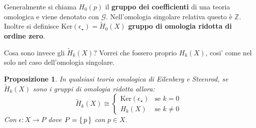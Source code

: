 \documentclass[10pt, twoside=false, x11names]{scrbook}
\newtheorem{proposition}[theorem]{Proposizione}
\newcommand{\Z}{\mathbb{Z}}
\renewcommand{\ker}[1]{\mathrm{Ker}( #1)}
\begin{document}
Generalmente si chiama $ H_0(p) $ il \textbf{gruppo dei coefficienti}
di una teoria omologica e viene denotato con $ \mathcal{G} $. Nell'omologia singolare relativa questo è $ \Z $.
Inoltre si definisce $ \ker{\epsilon_\star} = \tilde{H}_0(X) $ \textbf{gruppo di omologia ridotta di ordine zero}.

Cosa sono invece gli $ \tilde{H}_k(X) $? Vorrei che fossero proprio $ H_k(X) $,
cosi' come nel solo nel caso dell'omologia singolare.

\begin{proposition}
  In qualsiasi teoria omologica di Eilenberg e Steenrod, se $ \tilde{H}_k(X) $ sono
  i gruppi di omologia ridotta allora:
  \[
    \tilde{H}_k(X) \cong
    \begin{cases}
      \ker{\epsilon_\star} & \text{se } k = 0 \\
      H_k(X) & \text{se } k \not= 0
    \end{cases}
  \]
  Con $ \epsilon \colon X \to P $ dove $ P = \set{p} $ con $ p \in X $.
\end{proposition}
\end{document}
